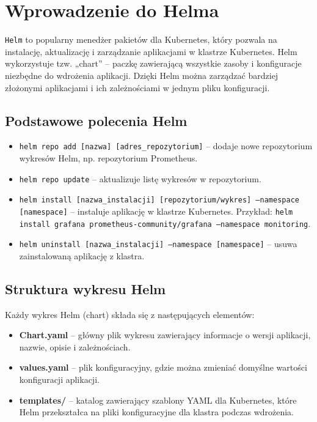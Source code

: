 \documentclass{article}
\begin{document}
\section{Wprowadzenie do Helma}

\texttt{Helm} to popularny menedżer pakietów dla Kubernetes, który pozwala na instalację, aktualizację i zarządzanie aplikacjami w klastrze Kubernetes. Helm wykorzystuje tzw. „chart” – paczkę zawierającą wszystkie zasoby i konfiguracje niezbędne do wdrożenia aplikacji. Dzięki Helm można zarządzać bardziej złożonymi aplikacjami i ich zależnościami w jednym pliku konfiguracji.

\subsection{Podstawowe polecenia Helm}
\begin{itemize}
    \item \texttt{helm repo add [nazwa] [adres\_repozytorium]} – dodaje nowe repozytorium wykresów Helm, np. repozytorium Prometheus.
    \item \texttt{helm repo update} – aktualizuje listę wykresów w repozytorium.
    \item \texttt{helm install [nazwa\_instalacji] [repozytorium/wykres] --namespace [namespace]} – instaluje aplikację w klastrze Kubernetes. Przykład: \texttt{helm install grafana prometheus-community/grafana --namespace monitoring}.
    \item \texttt{helm uninstall [nazwa\_instalacji] --namespace [namespace]} – usuwa zainstalowaną aplikację z klastra.
\end{itemize}

\subsection{Struktura wykresu Helm}
Każdy wykres Helm (chart) składa się z następujących elementów:
\begin{itemize}
    \item \textbf{Chart.yaml} – główny plik wykresu zawierający informacje o wersji aplikacji, nazwie, opisie i zależnościach.
    \item \textbf{values.yaml} – plik konfiguracyjny, gdzie można zmieniać domyślne wartości konfiguracji aplikacji.
    \item \textbf{templates/} – katalog zawierający szablony YAML dla Kubernetes, które Helm przekształca na pliki konfiguracyjne dla klastra podczas wdrożenia.
\end{itemize}
\end{document}
